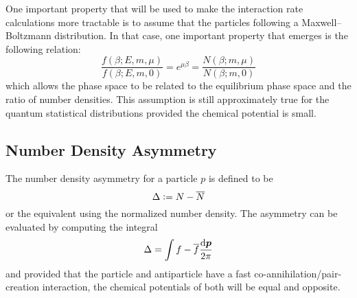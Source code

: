 \documentclass[
  a4paper,             %
  11pt,                %
  oneside,             %
  onecolumn,           %
  bibliography=totoc,  %
  final,               %
]{scrartcl}
\begin{document}
One important property that will be used to make the interaction rate
calculations more tractable is to assume that the particles following a
Maxwell--Boltzmann distribution.  In that case, one important property that
emerges is the following relation:
\begin{equation}
  \label{eq:phase_space_to_number_density}
  \frac{f(\beta; E, m, \mu)}{f(\beta; E, m, 0)} = e^{\mu \beta} = \frac{N(\beta; m, \mu)}{N(\beta; m, 0)}
\end{equation}
which allows the phase space to be related to the equilibrium phase space and
the ratio of number densities.  This assumption is still approximately true for
the quantum statistical distributions provided the chemical potential is small.

\subsection{Number Density Asymmetry}%
\label{sec:number_density_asymmetry}

The number density asymmetry for a particle \(p\) is defined to be
\begin{equation}
  \Delta \vcentcolon= N - \overline N
\end{equation}
or the equivalent using the normalized number density.  The asymmetry can be
evaluated by computing the integral
\begin{equation}
  \Delta = \int f - \overline f \ddbar{\vt p} 
\end{equation}
and provided that the particle and antiparticle have a fast
co-annihilation/pair-creation interaction, the chemical potentials of both will
be equal and opposite.
\end{document}
